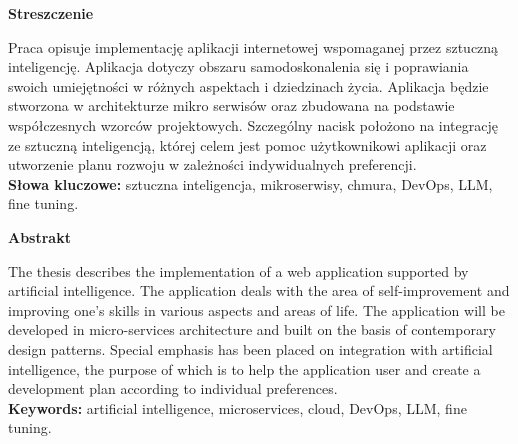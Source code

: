 \begin{center}
    {\bf\Large{Streszczenie}}\\
\end{center}
Praca opisuje implementację aplikacji internetowej wspomaganej przez sztuczną inteligencję. Aplikacja dotyczy obszaru samodoskonalenia się i poprawiania swoich umiejętności w różnych aspektach i dziedzinach życia. Aplikacja będzie stworzona w architekturze mikro serwisów oraz zbudowana na podstawie współczesnych wzorców projektowych.
Szczególny nacisk położono na integrację ze sztuczną inteligencją, której celem jest pomoc użytkownikowi aplikacji oraz utworzenie planu rozwoju w zależności indywidualnych preferencji.
\\
{\bf Słowa kluczowe:} sztuczna inteligencja, mikroserwisy, chmura, DevOps, LLM, fine tuning.
\clearpage

\begin{center}
    {\bf\Large{Abstrakt}}\\
\end{center}
The thesis describes the implementation of a web application supported by artificial intelligence. The application deals with the area of self-improvement and improving one's skills in various aspects and areas of life. The application will be developed in micro-services architecture and built on the basis of contemporary design patterns.
Special emphasis has been placed on integration with artificial intelligence, the purpose of which is to help the application user and create a development plan according to individual preferences.
\\
{\bf Keywords:} artificial intelligence, microservices, cloud, DevOps, LLM, fine tuning.


